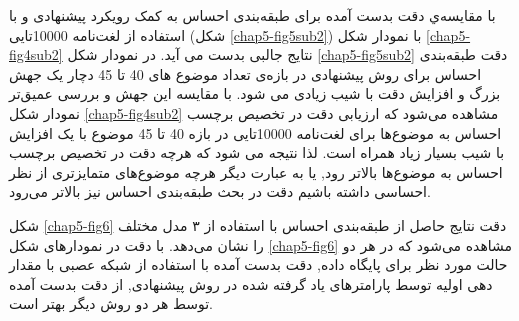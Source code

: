 با مقایسه‌ي دقت بدست آمده برای طبقه‌بندی احساس به کمک رویکرد پیشنهادی و با استفاده از لغت‌نامه 10000تایی (شکل \ref{chap5-fig5sub2}) با نمودار شکل 
\ref{chap5-fig4sub2}
نتایج جالبی بدست می آید. در نمودار شکل 
\ref{chap5-fig5sub2}
دقت طبقه‌بندی احساس برای روش پیشنهادی در بازه‌ی تعداد موضوع های 40 تا 45 دچار یک جهش بزرگ و افزایش دقت با شیب زیادی می شود. با مقایسه این جهش و بررسی عمیق‌تر نمودار شکل 
\ref{chap5-fig4sub2}
مشاهده می‌شود که ارزیابی دقت در تخصیص برچسب احساس به موضوع‌ها برای لغت‌نامه 10000تایی در بازه 40 تا 45 موضوع با یک افزایش با شیب بسيار زیاد همراه است. لذا نتیجه می شود که هرچه دقت در تخصیص برچسب احساس به موضوع‌ها بالاتر رود, یا به عبارت دیگر هرچه موضوع‌های متمایزتری از نظر احساسی داشته باشیم دقت در بحث طبقه‌بندی احساس نیز بالاتر می‌رود.

شکل 
\ref{chap5-fig6}
دقت نتایج حاصل از طبقه‌بندی احساس با استفاده از ۳ مدل مختلف را نشان می‌دهد. با دقت در نمودارهای شکل
\ref{chap5-fig6}
مشاهده می‌شود که در هر دو حالت مورد نظر برای پایگاه داده, دقت بدست آمده با استفاده از شبکه عصبی با مقدار دهی اولیه توسط پارامترهای یاد گرفته شده در روش پیشنهادی, از دقت بدست آمده توسط هر دو روش دیگر بهتر است.

